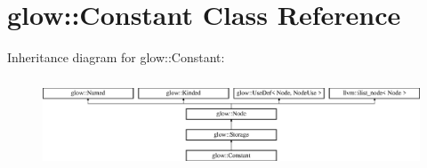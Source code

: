 \hypertarget{classglow_1_1_constant}{}\section{glow\+:\+:Constant Class Reference}
\label{classglow_1_1_constant}
Inheritance diagram for glow\+:\+:Constant\+:\begin{figure}[H]
\begin{center}
\leavevmode
\includegraphics[height=2.705314cm]{classglow_1_1_constant}
\end{center}
\end{figure}
